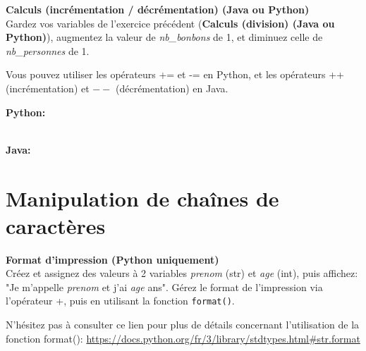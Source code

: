  \begin{Exercice}[5 minutes] \textbf{Calculs (incrémentation / décrémentation) (Java ou Python)}\\
    Gardez vos variables de l'exercice précédent (\textbf{Calculs (division) (Java ou Python)}), augmentez la valeur de \textit{nb\_bonbons} de 1, et diminuez celle de \textit{nb\_personnes} de 1.  \\
    
     \begin{conseil}
           Vous pouvez utiliser les opérateurs += et -= en Python, et les opérateurs ++ (incrémentation) et $--$ (décrémentation) en Java.
         
     \end{conseil}
     \begin{solution}
     
     \textbf{Python:}
     
     
     \textbf{\\Java:}
     
            
     \end{solution}   
 \end{Exercice}

\section{Manipulation de chaînes de caractères}

\begin{Exercice}[5 minutes] \textbf{Format d'impression (Python uniquement)}\\
   Créez et assignez des valeurs à 2 variables \textit{prenom} (str) et \textit{age} (int), puis affichez: "Je m'appelle \textit{prenom} et j'ai \textit{age} ans". Gérez le format de l'impression via l'opérateur +, puis en utilisant la fonction \lstinline{format()}. \\
   
    \begin{conseil}
       N'hésitez pas à consulter ce lien pour plus de détails concernant l'utilisation de la fonction format(): \url{https://docs.python.org/fr/3/library/stdtypes.html\#str.format}
    \end{conseil}
    \begin{solution}
     
    
           
    \end{solution}   
\end{Exercice}

